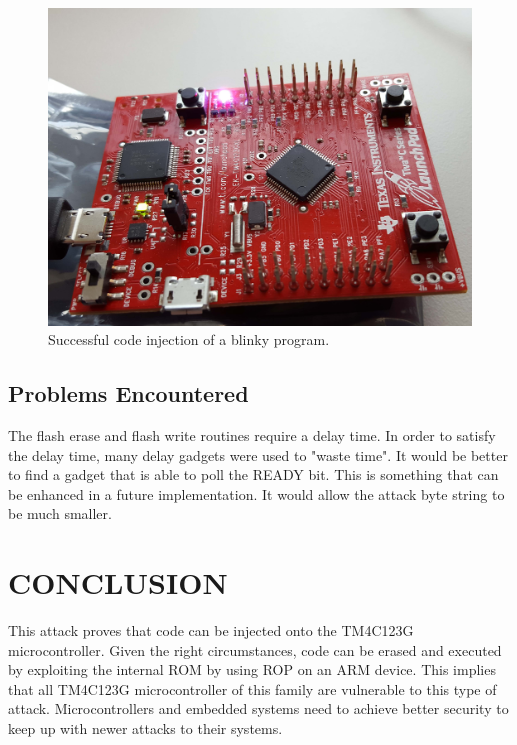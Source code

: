 \documentclass[letterpaper, 10 pt, conference]{ieeeconf}  %
\begin{document}
\begin{figure}[thpb]
	\centering
	\includegraphics[scale=.05]{board}
    \caption{Successful code injection of a blinky program.}
\end{figure}
  
\subsection{Problems Encountered}

The flash erase and flash write routines require a delay time.  In order to satisfy the delay time, many delay gadgets were used to "waste time".  It would be better to find a gadget that is able to poll the READY bit.  This is something that can be enhanced in a future implementation.  It would allow the attack byte string to be much smaller.

\section{CONCLUSION}

This attack proves that code can be injected onto the TM4C123G microcontroller. Given the right circumstances, code can be erased and executed by exploiting the internal ROM by using ROP on an ARM device. This implies that all TM4C123G microcontroller of this family are vulnerable to this type of attack. Microcontrollers and embedded systems need to achieve better security to keep up with newer attacks to their systems.

\addtolength{\textheight}{-12cm}   %
\end{document}
